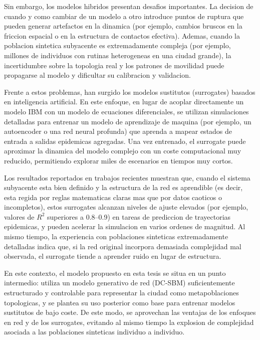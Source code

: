 Sin embargo, los modelos hibridos presentan desafios importantes. 
La decision de cuando y como cambiar de un modelo a otro introduce puntos de ruptura que pueden generar artefactos en la dinamica (por ejemplo, cambios bruscos en la friccion espacial o en la estructura de contactos efectiva). 
Ademas, cuando la poblacion sintetica subyacente es extremadamente compleja (por ejemplo, millones de individuos con rutinas heterogeneas en una ciudad grande), la incertidumbre sobre la topologia real y los patrones de movilidad puede propagarse al modelo y dificultar su calibracion y validacion.

Frente a estos problemas, han surgido los modelos sustitutos (surrogates) basados en inteligencia artificial. 
En este enfoque, en lugar de acoplar directamente un modelo IBM con un modelo de ecuaciones diferenciales, se utilizan simulaciones detalladas para entrenar un modelo de aprendizaje de maquina (por ejemplo, un autoencoder o una red neural profunda) que aprenda a mapear estados de entrada a salidas epidemicas agregadas. 
Una vez entrenado, el surrogate puede aproximar la dinamica del modelo complejo con un coste computacional muy reducido, permitiendo explorar miles de escenarios en tiempos muy cortos.

Los resultados reportados en trabajos recientes muestran que, cuando el sistema subyacente esta bien definido y la estructura de la red es aprendible (es decir, esta regida por reglas matematicas claras mas que por datos caoticos o incompletos), estos surrogates alcanzan niveles de ajuste elevados (por ejemplo, valores de $R^2$ superiores a 0.8–0.9) en tareas de prediccion de trayectorias epidemicas, y pueden acelerar la simulacion en varios ordenes de magnitud. 
Al mismo tiempo, la experiencia con poblaciones sinteticas extremadamente detalladas indica que, si la red original incorpora demasiada complejidad mal observada, el surrogate tiende a aprender ruido en lugar de estructura.

En este contexto, el modelo propuesto en esta tesis se situa en un punto intermedio: utiliza un modelo generativo de red (DC-SBM) suficientemente estructurado y controlable para representar la ciudad como metapoblaciones topologicas, y se plantea su uso posterior como base para entrenar modelos sustitutos de bajo coste. 
De este modo, se aprovechan las ventajas de los enfoques en red y de los surrogates, evitando al mismo tiempo la explosion de complejidad asociada a las poblaciones sinteticas individuo a individuo.



